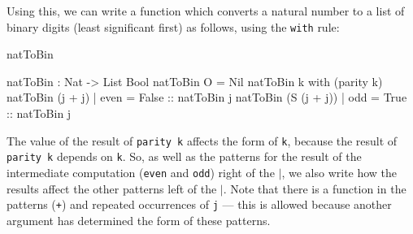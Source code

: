 \noindent
Using this, we can write a function which converts a natural number to a list
of binary digits (least significant first) as follows, using the \texttt{with}
rule:

\begin{SaveVerbatim}{natToBin}

natToBin : Nat -> List Bool
natToBin O = Nil
natToBin k with (parity k)
   natToBin (j + j)     | even = False :: natToBin j
   natToBin (S (j + j)) | odd  = True  :: natToBin j

\end{SaveVerbatim}

\noindent
The value of the result of \texttt{parity k} affects the form of \texttt{k}, 
because the result
of \texttt{parity k} depends on \texttt{k}. 
So, as well as the patterns for the result of the
intermediate computation (\texttt{even} and \texttt{odd}) right of the 
\texttt{$\mid$}, we also write how
the results affect the other patterns left of the $\mid$. Note that there is a
function in the patterns (\texttt{+}) and repeated occurrences of \texttt{j} --- 
this is allowed
because another argument has determined the form of these patterns.


